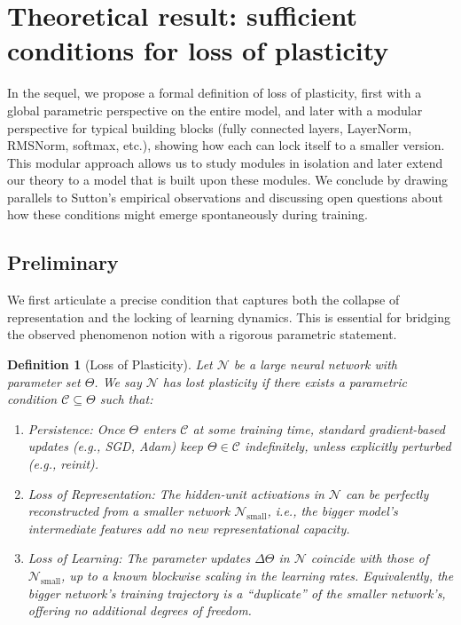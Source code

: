 \documentclass[11pt]{article}
\newtheorem{definition}{Definition}[section]
\begin{document}
\section{Theoretical result: sufficient conditions for loss of plasticity}

In the sequel, we propose a formal definition of loss of plasticity, first with a global parametric perspective on the entire model, and later with a modular perspective for typical building blocks (fully connected layers, LayerNorm, RMSNorm, softmax, etc.), showing how each can lock itself to a smaller version. This modular approach allows us to study modules in isolation and later extend our theory to a model that is built upon these modules. We conclude by drawing parallels to Sutton's empirical observations and discussing open questions about how these conditions might emerge spontaneously during training.

\subsection{Preliminary}

We first articulate a precise condition that captures both the collapse of representation and the locking of learning dynamics. This is essential for bridging the observed phenomenon notion with a rigorous parametric statement.

\begin{definition}[Loss of Plasticity]
\label{def:loss_of_plasticity}
Let $\mathcal{N}$ be a large neural network with parameter set $\Theta$. We say $\mathcal{N}$ has lost plasticity if there exists a parametric condition $\mathcal{C} \subseteq \Theta$ such that:
\begin{enumerate}
    \item Persistence: Once $\Theta$ enters $\mathcal{C}$ at some training time, standard gradient-based updates (e.g., SGD, Adam) keep $\Theta \in \mathcal{C}$ indefinitely, unless explicitly perturbed (e.g., reinit).
    \item Loss of Representation: The hidden-unit activations in $\mathcal{N}$ can be perfectly reconstructed from a smaller network $\mathcal{N}_{\text{small}}$, i.e., the bigger model's intermediate features add no new representational capacity.
    \item Loss of Learning: The parameter updates $\Delta \Theta$ in $\mathcal{N}$ coincide with those of $\mathcal{N}_{\text{small}}$, up to a known blockwise scaling in the learning rates. Equivalently, the bigger network's training trajectory is a ``duplicate'' of the smaller network's, offering no additional degrees of freedom.
\end{enumerate}
\end{definition}
\end{document}
